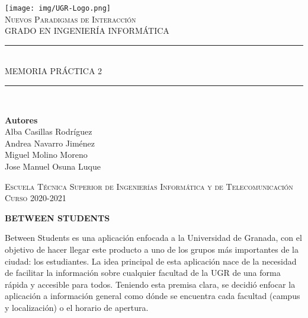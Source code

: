 \documentclass[11pt,a4paper]{article}
\newcommand{\autoral}{Alba Casillas Rodríguez}
\newcommand{\autorj}{Jose Manuel Osuna Luque}
\newcommand{\autoran}{Andrea Navarro Jiménez}
\newcommand{\autorm}{Miguel Molino Moreno}
\begin{document}

\begin{titlepage}

\begin{minipage}{\textwidth}

\centering

\texttt{[image: img/UGR-Logo.png]}\\

\textsc{\Large Nuevos Paradigmas de Interacción\\[0.2cm]}
\textsc{GRADO EN INGENIERÍA INFORMÁTICA}\\[1cm]

\noindent\rule[-1ex]{\textwidth}{1pt}\\[1.5ex]
\textsc{{\Huge MEMORIA PRÁCTICA 2\\}}
\noindent\rule[-1ex]{\textwidth}{2pt}\\[3.5ex]

\end{minipage}

\vspace{1.5cm}

\begin{minipage}{\textwidth}

\centering

\textbf{Autores}\\ {\autoral{}}\\{\autoran{}}\\{\autorm{}}\\{\autorj{}} \\[2.5ex]
\vspace{0.3cm}

\vspace{0.7cm}
\textsc{Escuela Técnica Superior de Ingenierías Informática y de Telecomunicación}\\
\vspace{1cm}
\textsc{Curso 2020-2021}
\end{minipage}
\end{titlepage}


\newpage


\textbf{{\Large BETWEEN STUDENTS\\}}

Between Students es una aplicación enfocada a la Universidad de Granada, con el objetivo de hacer llegar este producto a uno de los grupos más importantes de la ciudad: los estudiantes. La idea principal de esta aplicación nace de la necesidad de facilitar la información sobre cualquier facultad de la UGR de una forma rápida y accesible para todos. Teniendo esta premisa clara, se decidió enfocar la aplicación a información general como dónde se encuentra cada facultad (campus y localización) o el horario de apertura.\\
\end{document}
